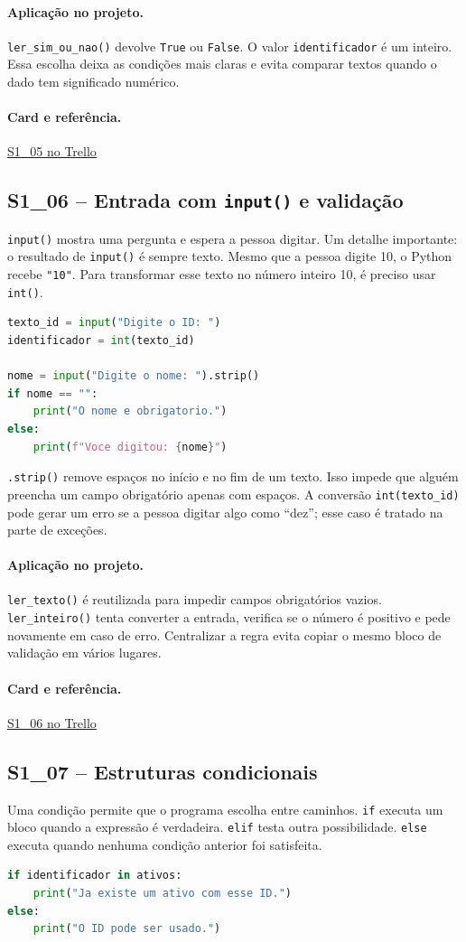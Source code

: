 \documentclass[11pt,a4paper]{article}
\newcommand{\projeto}{\paragraph{Aplicação no projeto.}}
\newcommand{\referencia}[2]{\paragraph{Card e referência.}\href{#1}{#2}}
\newcommand{\cardsection}[1]{\Needspace{12\baselineskip}\subsection{#1}}
\begin{document}
\projeto
\texttt{ler\_sim\_ou\_nao()} devolve \texttt{True} ou \texttt{False}. O valor \texttt{identificador} é um inteiro. Essa escolha deixa as condições mais claras e evita comparar textos quando o dado tem significado numérico.

\referencia{https://trello.com/c/DmvtABXt}{S1\_05 no Trello}

\cardsection{S1\_06 -- Entrada com \texttt{input()} e validação}

\texttt{input()} mostra uma pergunta e espera a pessoa digitar. Um detalhe importante: o resultado de \texttt{input()} é sempre texto. Mesmo que a pessoa digite 10, o Python recebe \texttt{"10"}. Para transformar esse texto no número inteiro 10, é preciso usar \texttt{int()}.

\begin{lstlisting}[language=Python,caption={Entrada de texto e conversão para inteiro}]
texto_id = input("Digite o ID: ")
identificador = int(texto_id)

nome = input("Digite o nome: ").strip()
if nome == "":
    print("O nome e obrigatorio.")
else:
    print(f"Voce digitou: {nome}")
\end{lstlisting}

\texttt{.strip()} remove espaços no início e no fim de um texto. Isso impede que alguém preencha um campo obrigatório apenas com espaços. A conversão \texttt{int(texto\_id)} pode gerar um erro se a pessoa digitar algo como ``dez''; esse caso é tratado na parte de exceções.

\projeto
\texttt{ler\_texto()} é reutilizada para impedir campos obrigatórios vazios. \texttt{ler\_inteiro()} tenta converter a entrada, verifica se o número é positivo e pede novamente em caso de erro. Centralizar a regra evita copiar o mesmo bloco de validação em vários lugares.

\referencia{https://trello.com/c/fFlJ9zCj}{S1\_06 no Trello}

\cardsection{S1\_07 -- Estruturas condicionais}

Uma condição permite que o programa escolha entre caminhos. \texttt{if} executa um bloco quando a expressão é verdadeira. \texttt{elif} testa outra possibilidade. \texttt{else} executa quando nenhuma condição anterior foi satisfeita.

\begin{lstlisting}[language=Python,caption={Condição para impedir ID duplicado}]
if identificador in ativos:
    print("Ja existe um ativo com esse ID.")
else:
    print("O ID pode ser usado.")
\end{lstlisting}
\end{document}
